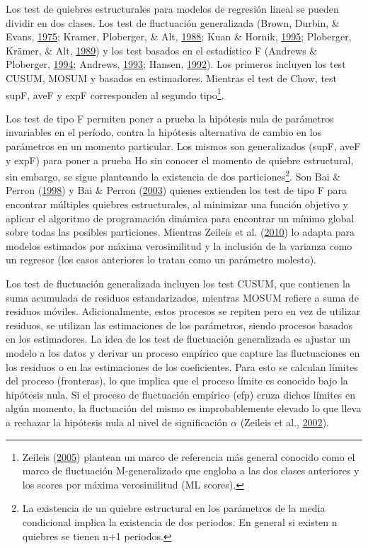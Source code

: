 \documentclass[12pt,oneside]{reedthesis}
\begin{document}
Los test de quiebres estructurales para modelos de regresión lineal se pueden dividir en dos clases. Los test de fluctuación generalizada (Brown, Durbin, \& Evans, \protect\hyperlink{ref-Brown1975}{1975}; Kramer, Ploberger, \& Alt, \protect\hyperlink{ref-Society1988}{1988}; Kuan \& Hornik, \protect\hyperlink{ref-Kuan1995}{1995}; Ploberger, Krämer, \& Alt, \protect\hyperlink{ref-Ploberger1989}{1989}) y los test basados en el estadístico F (Andrews \& Ploberger, \protect\hyperlink{ref-Andrews1994}{1994}; Andrews, \protect\hyperlink{ref-Andrews1993}{1993}; Hansen, \protect\hyperlink{ref-Hansen1992}{1992}). Los primeros incluyen los test CUSUM, MOSUM y basados en estimadores. Mientras el test de Chow, test supF, aveF y expF corresponden al segundo tipo\footnote{Zeileis (\protect\hyperlink{ref-Zeileis2005}{2005}) plantean un marco de referencia más general conocido como el marco de fluctuación M-generalizado que engloba a las dos clases anteriores y los scores por máxima verosimilitud (ML scores).}.

Los test de tipo F permiten poner a prueba la hipótesis nula de parámetros invariables en el período, contra la hipótesis alternativa de cambio en los parámetros en un momento particular. Los mismos son generalizados (supF, aveF y expF) para poner a prueba Ho sin conocer el momento de quiebre estructural, sin embargo, se sigue planteando la existencia de dos particiones\footnote{La existencia de un quiebre estructural en los parámetros de la media condicional implica la existencia de dos periodos. En general si existen n quiebres se tienen n+1 periodos.}. Son Bai \& Perron (\protect\hyperlink{ref-BaiPerron1998}{1998}) y Bai \& Perron (\protect\hyperlink{ref-BaiPerron2003}{2003}) quienes extienden los test de tipo F para encontrar múltiples quiebres estructurales, al minimizar una función objetivo y aplicar el algoritmo de programación dinámica para encontrar un mínimo global sobre todas las posibles particiones. Mientras Zeileis et al. (\protect\hyperlink{ref-Zeileis2010}{2010}) lo adapta para modelos estimados por máxima verosimilitud y la inclusión de la varianza como un regresor (los casos anteriores lo tratan como un parámetro molesto).

Los test de fluctuación generalizada incluyen los test CUSUM, que contienen la suma acumulada de residuos estandarizados, mientras MOSUM refiere a suma de residuos móviles. Adicionalmente, estos procesos se repiten pero en vez de utilizar residuos, se utilizan las estimaciones de los parámetros, siendo procesos basados en los estimadores. La idea de los test de fluctuación generalizada es ajustar un modelo a los datos y derivar un proceso empírico que capture las fluctuaciones en los residuos o en las estimaciones de los coeficientes. Para esto se calculan límites del proceso (fronteras), lo que implica que el proceso límite es conocido bajo la hipótesis nula. Si el proceso de fluctuación empírico (efp) cruza dichos límites en algún momento, la fluctuación del mismo es improbablemente elevado lo que lleva a rechazar la hipótesis nula al nivel de significación \(\alpha\) (Zeileis et al., \protect\hyperlink{ref-Zeileis2002}{2002}).
\end{document}
